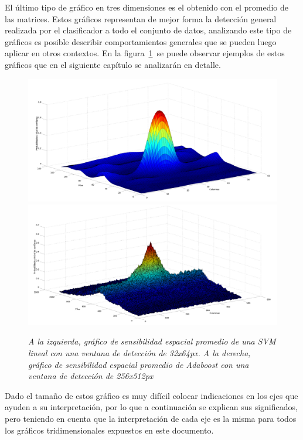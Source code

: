 El último tipo de gráfico en tres dimensiones es el obtenido con el promedio de las matrices. Estos gráficos representan de mejor forma la detección general realizada por el clasificador a todo el conjunto de datos, analizando este tipo de gráficos es posible describir comportamientos generales que se pueden luego aplicar en otros contextos. En la figura~\ref{fig:soutput}~se puede observar ejemplos de estos gráficos que en el siguiente capítulo se analizarán en detalle.

\begin{figure}[H]
  \centering
  \includegraphics[scale=.16]{images/meansvmout32}
  \includegraphics[scale=.16]{images/meanboostout256}
  \caption{\em A la izquierda, gráfico de sensibilidad espacial promedio de una SVM lineal con una ventana de detección de 32x64px. A la derecha, gráfico de sensibilidad espacial promedio de Adaboost con una ventana de detección de 256x512px}  
  \label{fig:soutput}
\end{figure}


Dado el tamaño de estos gráfico es muy difícil colocar indicaciones en los ejes que ayuden a su interpretación,  por lo que a continuación se explican sus significados, pero teniendo en cuenta que la interpretación de cada eje es la misma para todos los gráficos tridimensionales expuestos en este documento.

